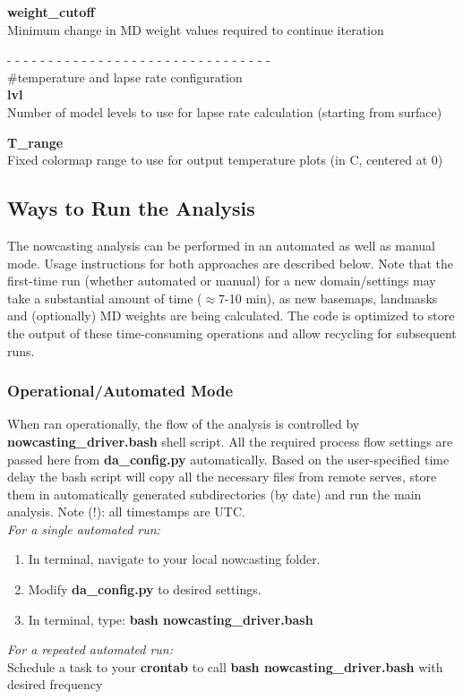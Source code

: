 \documentclass{article}
\begin{document}
\vspace{0.1cm}
\noindent \textbf{weight\_cutoff}\\
Minimum change in MD weight values required to continue iteration


\vspace{0.5cm}
\noindent- - - - - - - - - - - - - - - - - - - - - - - - - - - - - - - -\\
\noindent\#temperature and lapse rate configuration\\

\noindent \textbf{lvl}\\
Number of model levels to use for lapse rate calculation (starting from surface)

\vspace{0.1cm}
\noindent \textbf{T\_range}\\
Fixed colormap range to use for output temperature plots (in C, centered at 0)


\subsection{Ways to Run the Analysis}\label{sec:run}
The nowcasting analysis can be performed in an automated as well as manual mode. Usage instructions for both approaches are described below. Note that the first-time run (whether automated or manual) for a new domain/settings may take a substantial amount of time ($\approx$7-10 min), as new basemaps, landmasks and (optionally) MD weights are being calculated. The code is optimized to store the output of these time-consuming operations and allow recycling for subsequent runs. 

\subsubsection{Operational/Automated Mode}
When ran operationally, the flow of the analysis is controlled by \textbf{nowcasting\_driver.bash} shell script. All the required process flow settings are passed here from \textbf{da\_config.py} automatically. Based on the user-specified time delay the bash script will copy all the necessary files from remote serves, store them in automatically generated subdirectories (by date) and run the main analysis. Note (!): all timestamps are UTC. \\

\noindent \emph{For a single automated run:} 
\begin{enumerate}[1.]
\item In terminal, navigate to your local nowcasting folder. 
\item Modify \textbf{da\_config.py} to desired settings.
\item In terminal, type: \textbf{bash nowcasting\_driver.bash}\\
\end{enumerate}
\noindent \emph{For a repeated automated run:} \\
\noindent Schedule a task to your \textbf{crontab} to call  \textbf{bash nowcasting\_driver.bash} with desired frequency\\
\end{document}
